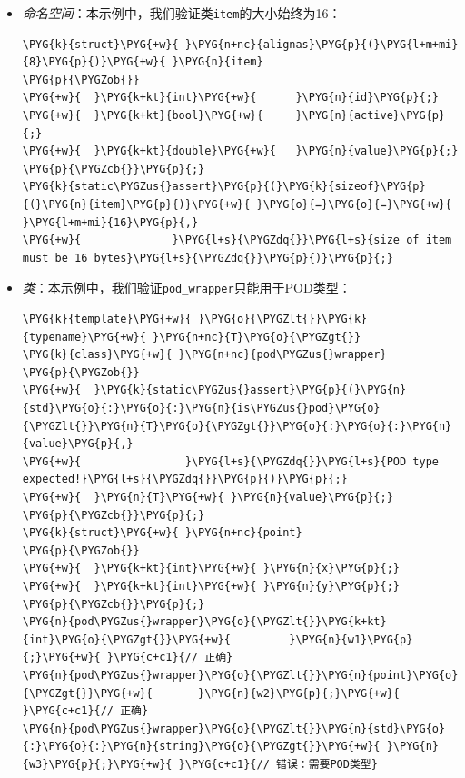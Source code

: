 \begin{itemize}
\item \textit{命名空间}：本示例中，我们验证类\texttt{item}的大小始终为16：



\begin{codeblockbg}
\begin{Verbatim}[commandchars=\\\{\},breaklines=true,breakanywhere=true,fontsize=\codefont,xleftmargin=17bp]
\PYG{k}{struct}\PYG{+w}{ }\PYG{n+nc}{alignas}\PYG{p}{(}\PYG{l+m+mi}{8}\PYG{p}{)}\PYG{+w}{ }\PYG{n}{item}
\PYG{p}{\PYGZob{}}
\PYG{+w}{  }\PYG{k+kt}{int}\PYG{+w}{      }\PYG{n}{id}\PYG{p}{;}
\PYG{+w}{  }\PYG{k+kt}{bool}\PYG{+w}{     }\PYG{n}{active}\PYG{p}{;}
\PYG{+w}{  }\PYG{k+kt}{double}\PYG{+w}{   }\PYG{n}{value}\PYG{p}{;}
\PYG{p}{\PYGZcb{}}\PYG{p}{;}
\PYG{k}{static\PYGZus{}assert}\PYG{p}{(}\PYG{k}{sizeof}\PYG{p}{(}\PYG{n}{item}\PYG{p}{)}\PYG{+w}{ }\PYG{o}{=}\PYG{o}{=}\PYG{+w}{ }\PYG{l+m+mi}{16}\PYG{p}{,}
\PYG{+w}{              }\PYG{l+s}{\PYGZdq{}}\PYG{l+s}{size of item must be 16 bytes}\PYG{l+s}{\PYGZdq{}}\PYG{p}{)}\PYG{p}{;}
\end{Verbatim}
\end{codeblockbg}



\item \textit{类}：本示例中，我们验证\texttt{pod\_\allowbreak{}wrapper}只能用于POD类型：



\begin{codeblockbg}
\begin{Verbatim}[commandchars=\\\{\},breaklines=true,breakanywhere=true,fontsize=\codefont,xleftmargin=17bp]
\PYG{k}{template}\PYG{+w}{ }\PYG{o}{\PYGZlt{}}\PYG{k}{typename}\PYG{+w}{ }\PYG{n+nc}{T}\PYG{o}{\PYGZgt{}}
\PYG{k}{class}\PYG{+w}{ }\PYG{n+nc}{pod\PYGZus{}wrapper}
\PYG{p}{\PYGZob{}}
\PYG{+w}{  }\PYG{k}{static\PYGZus{}assert}\PYG{p}{(}\PYG{n}{std}\PYG{o}{:}\PYG{o}{:}\PYG{n}{is\PYGZus{}pod}\PYG{o}{\PYGZlt{}}\PYG{n}{T}\PYG{o}{\PYGZgt{}}\PYG{o}{:}\PYG{o}{:}\PYG{n}{value}\PYG{p}{,}
\PYG{+w}{                }\PYG{l+s}{\PYGZdq{}}\PYG{l+s}{POD type expected!}\PYG{l+s}{\PYGZdq{}}\PYG{p}{)}\PYG{p}{;}
\PYG{+w}{  }\PYG{n}{T}\PYG{+w}{ }\PYG{n}{value}\PYG{p}{;}
\PYG{p}{\PYGZcb{}}\PYG{p}{;}
\PYG{k}{struct}\PYG{+w}{ }\PYG{n+nc}{point}
\PYG{p}{\PYGZob{}}
\PYG{+w}{  }\PYG{k+kt}{int}\PYG{+w}{ }\PYG{n}{x}\PYG{p}{;}
\PYG{+w}{  }\PYG{k+kt}{int}\PYG{+w}{ }\PYG{n}{y}\PYG{p}{;}
\PYG{p}{\PYGZcb{}}\PYG{p}{;}
\PYG{n}{pod\PYGZus{}wrapper}\PYG{o}{\PYGZlt{}}\PYG{k+kt}{int}\PYG{o}{\PYGZgt{}}\PYG{+w}{         }\PYG{n}{w1}\PYG{p}{;}\PYG{+w}{ }\PYG{c+c1}{// 正确}
\PYG{n}{pod\PYGZus{}wrapper}\PYG{o}{\PYGZlt{}}\PYG{n}{point}\PYG{o}{\PYGZgt{}}\PYG{+w}{       }\PYG{n}{w2}\PYG{p}{;}\PYG{+w}{ }\PYG{c+c1}{// 正确}
\PYG{n}{pod\PYGZus{}wrapper}\PYG{o}{\PYGZlt{}}\PYG{n}{std}\PYG{o}{:}\PYG{o}{:}\PYG{n}{string}\PYG{o}{\PYGZgt{}}\PYG{+w}{ }\PYG{n}{w3}\PYG{p}{;}\PYG{+w}{ }\PYG{c+c1}{// 错误：需要POD类型}
\end{Verbatim}
\end{codeblockbg}



\end{itemize}
